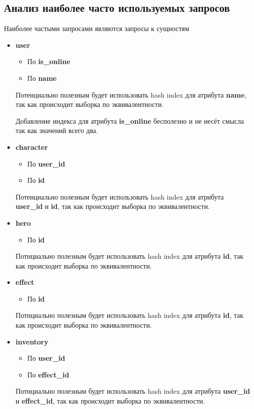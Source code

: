 \newpage

\subsection*{Анализ наиболее часто используемых запросов}


Наиболее частыми запросами являются запросы к сущностям 
\begin{itemize}
    \item \textbf{user}
    \begin{itemize}
        \item По \textbf{is\_online}
        \item По \textbf{name}
    \end{itemize}
    Потенциально полезным будет использовать hash index для атрибута \textbf{name}, так как происходит выборка по эквивалентности.

    Добавление индекса для атрибута \textbf{is\_online} бесполезно и не несёт смысла так как значений всего два.
    
    \item \textbf{character}
    \begin{itemize}
        \item По \textbf{user\_id}
        \item По \textbf{id}
    \end{itemize}

    Потенциально полезным будет использовать hash index для атрибута \textbf{user\_id} и \textbf{id}, так как происходит выборка по эквивалентности.

    \item \textbf{hero}
    \begin{itemize}
        \item По \textbf{id}
    \end{itemize}

    Потнциально полезным будет использовать hash index для атрибута \textbf{id}, так как происходит выборка по эквивалентности.

    \item \textbf{effect}
    \begin{itemize}
        \item По \textbf{id}
    \end{itemize}

    Потнциально полезным будет использовать hash index для атрибута \textbf{id}, так как происходит выборка по эквивалентности.

    \item \textbf{inventory}
    \begin{itemize}
        \item По \textbf{user\_id}
        \item По \textbf{effect\_id}
    \end{itemize}

    Потнциально полезным будет использовать hash index для атрибута \textbf{user\_id} и \textbf{effect\_id}, так как происходит выборка по эквивалентности.
\end{itemize}

